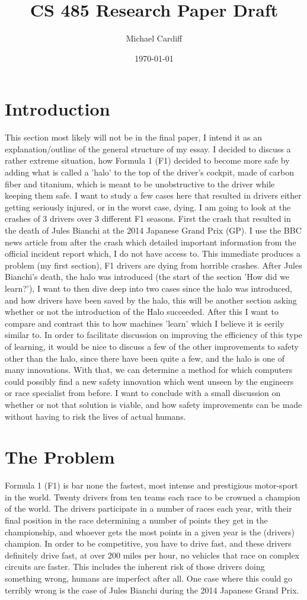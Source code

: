 \documentclass[letterpaper, 12pt]{article}
\title{CS 485 Research Paper Draft}
\author{Michael Cardiff}
\date{\today}
\numberwithin{figure}{section}
\begin{document}
\maketitle\nocite{*}
\section{Introduction}
This section most likely will not be in the final paper, I intend it as an explanation/outline of the general structure of my essay. I decided to discuss a rather extreme situation, how Formula 1 (F1) decided to become more safe by adding what is called a 'halo' to the top of the driver's cockpit, made of carbon fiber and titanium, which is meant to be unobstructive to the driver while keeping them safe. I want to study a few cases here that resulted in drivers either getting seriously injured, or in the worst case, dying. I am going to look at the crashes of 3 drivers over 3 different F1 seasons. First the crash that resulted in the death of Jules Bianchi at the 2014 Japanese Grand Prix (GP). I use the BBC news article \cite{bianchi} from after the crash which detailed important information from the official incident report which, I do not have access to. This immediate produces a problem (my first section), F1 drivers are dying from horrible crashes. After Jules Bianchi's death, the halo was introduced (the start of the section 'How did we learn?'), I want to then dive deep into two cases since the halo was introduced, and how drivers have been saved by the halo, this will be another section asking whether or not the introduction of the Halo succeeded. After this I want to compare and contrast this to how machines 'learn' which I believe it is eerily similar to. In order to facilitate discussion on improving the efficiency of this type of learning, it would be nice to discuss a few of the other improvements to safety other than the halo, since there have been quite a few, and the halo is one of many innovations. With that, we can determine a method for which computers could possibly find a new safety innovation which went unseen by the engineers or race specialist from before. I want to conclude with a small discussion on whether or not that solution is viable, and how safety improvements can be made without having to risk the lives of actual humans.
\section{The Problem}
Formula 1 (F1) is bar none the fastest, most intense and prestigious motor-sport in the world. Twenty drivers from ten teams each race to be crowned a champion of the world. The drivers participate in a number of races each year, with their final position in the race determining a number of points they get in the championship, and whoever gets the most points in a given year is the (drivers) champion. In order to be competitive, you have to drive fast, and these drivers definitely drive fast, at over 200 miles per hour, no vehicles that race on complex circuits are faster. This includes the inherent risk of those drivers doing something wrong, humans are imperfect after all. One case where this could go terribly wrong is the case of Jules Bianchi during the 2014 Japanese Grand Prix. 
\end{document}
